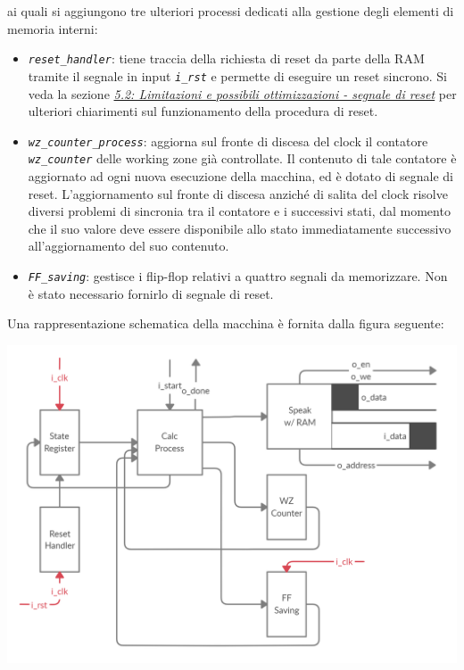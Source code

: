 \documentclass[12pt,a4paper,titlepage]{article}
\begin{document}
		ai quali si aggiungono tre ulteriori processi dedicati alla gestione degli elementi di memoria interni:
		\begin{itemize}
			\item \textit{\texttt{reset\_handler}}: tiene traccia della richiesta di reset da parte della RAM tramite il segnale in input \textit{\texttt{i\_rst}} e permette di eseguire un reset sincrono. Si veda la sezione \hyperref[sec:reset]{\textit{5.2: Limitazioni e possibili ottimizzazioni - segnale di reset}} per ulteriori chiarimenti sul funzionamento della procedura di reset.	
			
			\item \textit{\texttt{wz\_counter\_process}}: aggiorna sul fronte di discesa del clock il contatore \textit{\texttt{wz\_counter}} delle working zone già controllate. Il contenuto di tale contatore è aggiornato ad ogni nuova esecuzione della macchina, ed è dotato di segnale di reset. L'aggiornamento sul fronte di discesa anziché di salita del clock risolve diversi problemi di sincronia tra il contatore e i successivi stati, dal momento che il suo valore deve essere disponibile allo stato immediatamente successivo all'aggiornamento del suo contenuto.
			
			\item \textit{\texttt{FF\_saving}}: gestisce i flip-flop relativi a quattro segnali da memorizzare. Non è stato necessario fornirlo di segnale di reset.
			
		\end{itemize}
		
		Una rappresentazione schematica della macchina è fornita dalla figura seguente:
		\begin{center}
			\includegraphics[scale=0.325]{arch_v1_1.png}
		\end{center}
		
\end{document}
